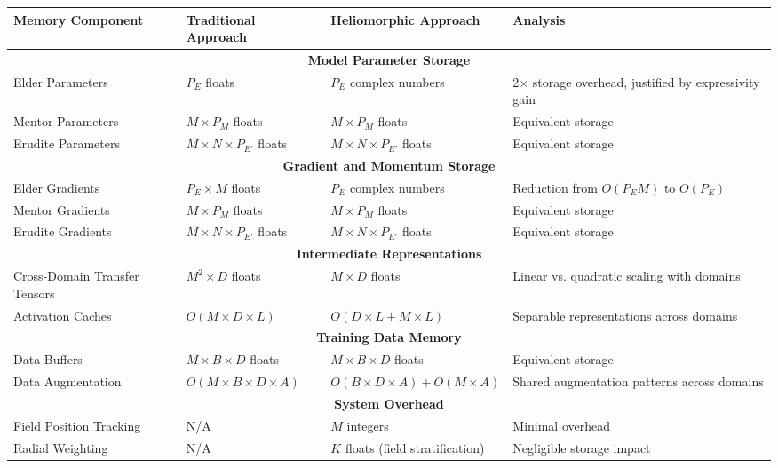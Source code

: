 \begin{definition}
\begin{theorem}
\begin{table}[h]
\centering
\begin{tabular}{|p{3.5cm}|p{3.5cm}|p{3.5cm}|p{3.5cm}|}
\hline
\textbf{Memory Component} & \textbf{Traditional Approach} & \textbf{Heliomorphic Approach} & \textbf{Analysis} \\
\hline
\multicolumn{4}{|c|}{\textbf{Model Parameter Storage}} \\
\hline
Elder Parameters & $P_E$ floats & $P_E$ complex numbers & 2× storage overhead, justified by expressivity gain \\
\hline
Mentor Parameters & $M \times P_M$ floats & $M \times P_M$ floats & Equivalent storage \\
\hline
Erudite Parameters & $M \times N \times P_{E'}$ floats & $M \times N \times P_{E'}$ floats & Equivalent storage \\
\hline
\multicolumn{4}{|c|}{\textbf{Gradient and Momentum Storage}} \\
\hline
Elder Gradients & $P_E \times M$ floats & $P_E$ complex numbers & Reduction from $O(P_E M)$ to $O(P_E)$ \\
\hline
Mentor Gradients & $M \times P_M$ floats & $M \times P_M$ floats & Equivalent storage \\
\hline
Erudite Gradients & $M \times N \times P_{E'}$ floats & $M \times N \times P_{E'}$ floats & Equivalent storage \\
\hline
\multicolumn{4}{|c|}{\textbf{Intermediate Representations}} \\
\hline
Cross-Domain Transfer Tensors & $M^2 \times D$ floats & $M \times D$ floats & Linear vs. quadratic scaling with domains \\
\hline
Activation Caches & $O(M \times D \times L)$ & $O(D \times L + M \times L)$ & Separable representations across domains \\
\hline
\multicolumn{4}{|c|}{\textbf{Training Data Memory}} \\
\hline
Data Buffers & $M \times B \times D$ floats & $M \times B \times D$ floats & Equivalent storage \\
\hline
Data Augmentation & $O(M \times B \times D \times A)$ & $O(B \times D \times A) + O(M \times A)$ & Shared augmentation patterns across domains \\
\hline
\multicolumn{4}{|c|}{\textbf{System Overhead}} \\
\hline
Field Position Tracking & N/A & $M$ integers & Minimal overhead \\
\hline
Radial Weighting & N/A & $K$ floats (field stratification) & Negligible storage impact \\

\end{tabular}
\end{table}
\end{theorem}
\end{definition}
